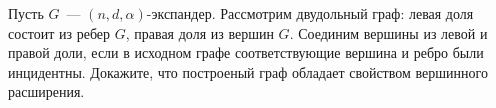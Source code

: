 Пусть $G$~--- $(n, d, \alpha)$-экспандер. Рассмотрим двудольный граф: левая доля состоит из ребер $G$,
правая доля из вершин $G$. Соединим вершины из левой и правой доли, если в исходном графе соответствующие
вершина и ребро были инцидентны. Докажите, что построеный граф обладает свойством вершинного расширения.
